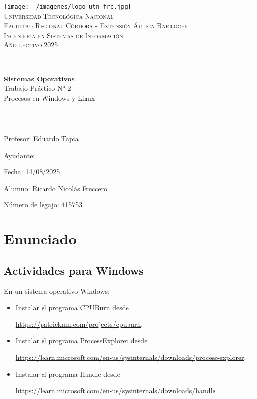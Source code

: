 \documentclass[12pt]{article}
\begin{document}
  \begin{titlepage}
    \centering
    \texttt{[image: ~/imagenes/logo\_utn\_frc.jpg]}\\

    \textsc{
      \LARGE Universidad Tecnológica Nacional\\
      \Large Facultad Regional Córdoba - Extensión Áulica Bariloche\\
      \large Ingeniería en Sistemas de Información\\
      Año lectivo 2025\\[0.5cm]
    }

    \rule{\linewidth}{1.0mm}\\[0.4cm]
    \Huge
    \textbf{Sistemas Operativos}\\
    Trabajo Práctico N° 2\\[0.2cm]
    \LARGE
    Procesos en Windows y Linux
    \rule{\linewidth}{1.0mm}\\
    \large
    \begin{flushleft}
      Profesor: Eduardo Tapia

      Ayudante: 

      Fecha: 14/08/2025
    \end{flushleft}

    \vfill
    \begin{flushright}
      Alumno: Ricardo Nicolás Freccero

      Número de legajo: 415753
    \end{flushright}
  \end{titlepage}

  \restoregeometry
  \tableofcontents
  \newpage

  \section{Enunciado}
  \subsection{Actividades para Windows}
  En un sistema operativo Windows:
  \begin{itemize}
    \item Instalar el programa CPUBurn desde 

      \href{https://patrickmn.com/projects/cpuburn}{https://patrickmn.com/projects/cpuburn}.

    \item Instalar el programa ProcessExplorer desde 

      \href{https://learn.microsoft.com/en-us/sysinternals/downloads/process-explorer}{https://learn.microsoft.com/en-us/sysinternals/downloads/process-explorer}.

    \item Instalar el programa Handle desde 

      \href{https://learn.microsoft.com/en-us/sysinternals/downloads/handle}{https://learn.microsoft.com/en-us/sysinternals/downloads/handle}.
  \end{itemize}
\end{document}
